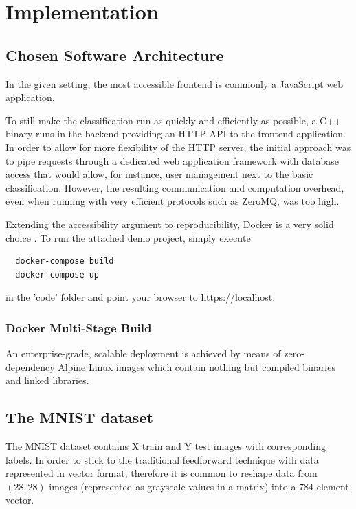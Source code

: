 \chapter{Implementation}
\label{chap:implementation}

\section{Chosen Software Architecture}
In the given setting, the most accessible frontend is commonly a JavaScript web application.

To still make the classification run as quickly and efficiently as possible, a C++ binary runs
in the backend providing an HTTP API to the frontend application.
In order to allow for more flexibility of the HTTP server, the initial approach was to
pipe requests through a dedicated web application framework with database access
that would allow, for instance, user management next to the basic classification.
However, the resulting communication and computation overhead, even when running with very
efficient protocols such as ZeroMQ, was too high.

Extending the accessibility argument to reproducibility, Docker is a very solid choice \parencite{using-docker-in-science}.
To run the attached demo project, simply execute
\begin{verbatim}
  docker-compose build
  docker-compose up
\end{verbatim}
in the 'code' folder and point your browser to \url{https://localhost}.

\subsection{Docker Multi-Stage Build}
An enterprise-grade, scalable deployment is achieved by means of zero-dependency
Alpine Linux images which contain nothing but compiled binaries and linked libraries.


\section{The MNIST dataset}
The MNIST dataset \parencite{mnist-original} contains X train and Y test images with corresponding labels.
In order to stick to the traditional feedforward technique with data represented
in vector format, therefore it is common to reshape data from $(28, 28)$ images (represented as grayscale values in a matrix)
into a $784$ element vector.

